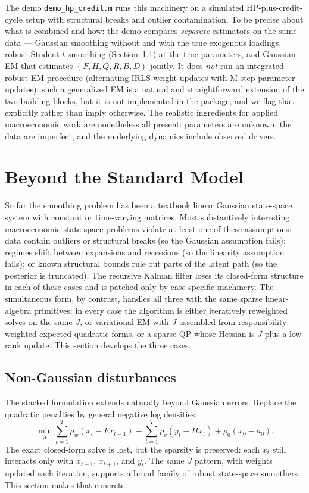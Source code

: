 \documentclass[11pt]{article}
\begin{document}
The demo \texttt{demo\_hp\_credit.m} runs this machinery on a
simulated HP-plus-credit-cycle setup with structural breaks and
outlier contamination.  To be precise about what is combined and how:
the demo compares \emph{separate} estimators on the same data ---
Gaussian smoothing without and with the true exogenous loadings,
robust Student-$t$ smoothing (Section~\ref{sec:robust}) at the true
parameters, and Gaussian EM that estimates $(F,H,Q,R,B,D)$ jointly.
It does \emph{not} run an integrated robust-EM procedure (alternating
IRLS weight updates with M-step parameter updates); such a generalized
EM is a natural and straightforward extension of the two building
blocks, but it is not implemented in the package, and we flag that
explicitly rather than imply otherwise.  The realistic ingredients for
applied macroeconomic work are nonetheless all present: parameters are
unknown, the data are imperfect, and the underlying dynamics include
observed drivers.

\section{Beyond the Standard Model}
\label{sec:beyond}

So far the smoothing problem has been a textbook linear Gaussian
state-space system with constant or time-varying matrices.  Most
substantively interesting macroeconomic state-space problems
violate at least one of these assumptions: data contain outliers
or structural breaks (so the Gaussian assumption fails); regimes
shift between expansions and recessions (so the linearity
assumption fails); or known structural bounds rule out parts of
the latent path (so the posterior is truncated).  The recursive
Kalman filter loses its closed-form structure in each of these
cases and is patched only by case-specific machinery.  The
simultaneous form, by contrast, handles all three with the same
sparse linear-algebra primitives: in every case the algorithm is
either iteratively reweighted solves on the same $J$, or
variational EM with $J$ assembled from responsibility-weighted
expected quadratic forms, or a sparse QP whose Hessian is $J$ plus
a low-rank update.  This section develops the three cases.

\subsection{Non-Gaussian disturbances}
\label{sec:robust}

The stacked formulation extends naturally beyond Gaussian errors.
Replace the quadratic penalties by general negative log densities:
\begin{equation}
\min_X \sum_{t=1}^T \rho_w(x_t-Fx_{t-1})+
\sum_{t=1}^T \rho_v(y_t-Hx_t)+\rho_0(x_0-a_0).
\end{equation}
The exact closed-form solve is lost, but the sparsity is preserved:
each $x_t$ still interacts only with $x_{t-1}$, $x_{t+1}$, and $y_t$.
The same $J$ pattern, with weights updated each iteration, supports a
broad family of robust state-space smoothers.  This section makes that
concrete.
\end{document}
